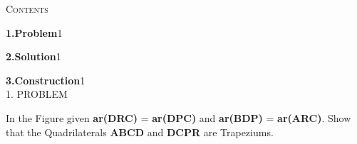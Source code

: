 \documentclass[a4paper,10pt]{report}
\begin{document}
\begin{multicols}{2}
\centering \large\textsc{C}\footnotesize\textsc{ontents}\vspace{5mm}
\\
\raggedright\large\textbf{1.\hspace{1cm}Problem}\hspace{3cm}1\vspace{5mm}\\
\raggedright\large\textbf{2.\hspace{1cm}Solution}\hspace{3.1cm}1\vspace{5mm}\\
\raggedright\large\textbf{3.\hspace{1cm}Construction}\hspace{2.1cm}1\vspace{5mm}\\


\centering \large\textsc{1.  P}\footnotesize\textsc{ROBLEM}\vspace{5mm}\\
	\raggedright\large In the Figure given \textbf{ar(DRC)} = \textbf{ar(DPC)} and \textbf{ar(BDP)} = \textbf{ar(ARC)}. Show that the Quadrilaterals \textbf{ABCD} and \textbf{DCPR} are Trapeziums.\\ \vspace{3mm}


\end{multicols}
\end{document}
